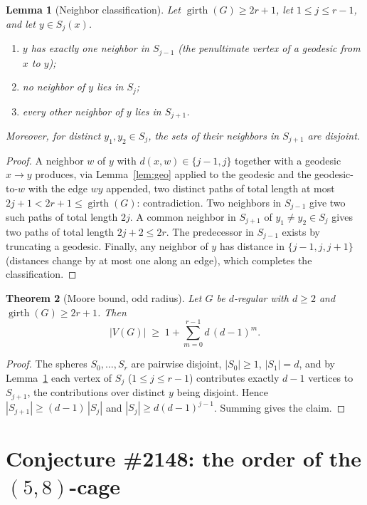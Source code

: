 \documentclass[11pt]{article}
\newtheorem{theorem}{Theorem}
\newtheorem{lemma}[theorem]{Lemma}
\theoremstyle{definition}
\theoremstyle{remark}
\theoremstyle{definition}
\begin{document}
\begin{lemma}[Neighbor classification]\label{lem:class}
Let $\operatorname{girth}(G) \ge 2r+1$, let $1 \le j \le r-1$, and let $y \in S_j(x)$.
\begin{enumerate}
\item $y$ has exactly one neighbor in $S_{j-1}$ (the penultimate vertex of a geodesic from $x$ to $y$);
\item no neighbor of $y$ lies in $S_j$;
\item every other neighbor of $y$ lies in $S_{j+1}$.
\end{enumerate}
Moreover, for distinct $y_1, y_2 \in S_j$, the sets of their neighbors in $S_{j+1}$ are disjoint.
\end{lemma}

\begin{proof}
A neighbor $w$ of $y$ with $d(x,w) \in \{j-1, j\}$ together with a geodesic $x \to y$ produces, via Lemma~\ref{lem:geo} applied to the geodesic and the geodesic-to-$w$ with the edge $wy$ appended, two distinct paths of total length at most $2j+1 < 2r+1 \le \operatorname{girth}(G)$: contradiction. Two neighbors in $S_{j-1}$ give two such paths of total length $2j$. A common neighbor in $S_{j+1}$ of $y_1 \ne y_2 \in S_j$ gives two paths of total length $2j+2 \le 2r$. The predecessor in $S_{j-1}$ exists by truncating a geodesic. Finally, any neighbor of $y$ has distance in $\{j-1, j, j+1\}$ (distances change by at most one along an edge), which completes the classification.
\end{proof}

\begin{theorem}[Moore bound, odd radius]\label{thm:moore}
Let $G$ be $d$-regular with $d \ge 2$ and $\operatorname{girth}(G) \ge 2r + 1$. Then
\[
|V(G)| \;\ge\; 1 + \sum_{m=0}^{r-1} d\,(d-1)^m .
\]
\end{theorem}

\begin{proof}
The spheres $S_0, \dots, S_r$ are pairwise disjoint, $|S_0| \ge 1$, $|S_1| = d$, and by Lemma~\ref{lem:class} each vertex of $S_j$ ($1 \le j \le r-1$) contributes exactly $d - 1$ vertices to $S_{j+1}$, the contributions over distinct $y$ being disjoint. Hence $|S_{j+1}| \ge (d-1)\,|S_j|$ and $|S_j| \ge d (d-1)^{j-1}$. Summing gives the claim.
\end{proof}

\section{Conjecture \#2148: the order of the $(5,8)$-cage}
\end{document}
